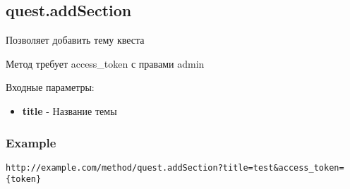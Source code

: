 \subsection{quest.addSection}

Позволяет добавить тему квеста

Метод требует access\_token с правами admin

Входные параметры:
\begin{itemize}
  \item \textbf{title} - Название темы
\end{itemize}

\subsubsection{Example}
\begin{Verbatim}[frame=single]
http://example.com/method/quest.addSection?title=test&access_token={token}
\end{Verbatim}